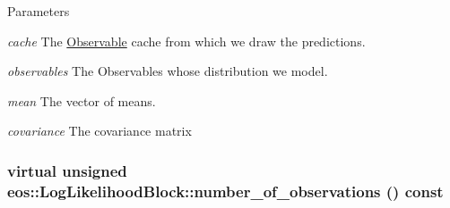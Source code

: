 \begin{DoxyParams}{Parameters}
\item[{\em cache}]The \hyperlink{classeos_1_1Observable}{Observable} cache from which we draw the predictions. \item[{\em observables}]The Observables whose distribution we model. \item[{\em mean}]The vector of means. \item[{\em covariance}]The covariance matrix \end{DoxyParams}
\hypertarget{classeos_1_1LogLikelihoodBlock_a48f03be5dc8284368cae6a9830627f2e}{
\subsubsection[{number\_\-of\_\-observations}]{\setlength{\rightskip}{0pt plus 5cm}virtual unsigned eos::LogLikelihoodBlock::number\_\-of\_\-observations () const}}
\label{classeos_1_1LogLikelihoodBlock_a48f03be5dc8284368cae6a9830627f2e}


